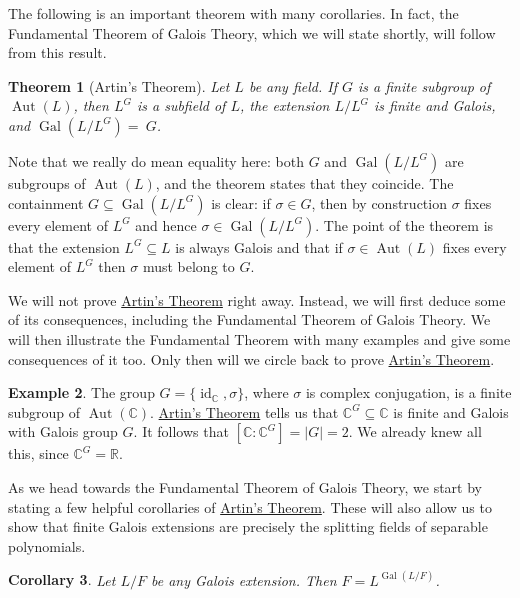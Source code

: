 \documentclass[12pt]{report}
\newtheorem{theorem}{Theorem}[chapter]
\newtheorem{corollary}[theorem]{Corollary}
\numberwithin{equation}{section}
\numberwithin{theorem}{chapter}
\theoremstyle{definition}
\newtheorem{example}[theorem]{Example}
\newtheorem*{basic properties}{Basic Properties}
\newtheorem*{Important Remark}{Important Remark}
\DeclareMathOperator{\Gal}{Gal}
\newcommand{\R}{\mathbb{R}}
\newcommand{\C}{\mathbb{C}}
\DeclareMathOperator{\id}{id}
\DeclareMathOperator{\Aut}{Aut}
\begin{document}
The following is an important theorem with many corollaries. In fact, the Fundamental Theorem of Galois Theory, which we will state shortly, will follow from this result.


\begin{theorem}[Artin's Theorem] \label{Artin's theorem}
Let $L$ be any field. If $G$ is a finite subgroup of $\Aut(L)$, then $L^G$ is a subfield of $L$, the extension $L/L^G$ is finite and Galois, and $\Gal(L/L^G) =~G$.
\end{theorem}

Note that we really do mean equality here: both $G$ and $\Gal(L/L^G)$ are subgroups of $\Aut(L)$, and the theorem states that they coincide. The containment $G \subseteq \Gal(L/L^G)$ is clear: if $\sigma \in G$, then by construction $\sigma$ fixes every element of $L^G$ and hence $\sigma \in \Gal(L/L^G)$. The point of the theorem is that the extension $L^G \subseteq L$ is always Galois and that if $\sigma \in \Aut(L)$ fixes every element of $L^G$ then $\sigma$ must belong to $G$.

We will not prove \hyperref[Artin's theorem]{Artin's Theorem} right away. Instead, we will first deduce some of its consequences, including the Fundamental Theorem of Galois Theory. We will then illustrate the Fundamental Theorem with many examples and give some consequences of it too. Only then will we circle back to prove \hyperref[Artin's theorem]{Artin's Theorem}.

\begin{example} 
The group $G = \{\id_{\C}, \sigma \}$, where $\sigma$ is complex conjugation, is a finite subgroup of $\Aut(\C)$. \hyperref[Artin's theorem]{Artin's Theorem} tells us that $\C^G \subseteq \C$ is finite and Galois with Galois group $G$. It follows that $[\C : \C^G] = |G| = 2$. We already knew all this, since $\C^G = \R$.
\end{example}

As we head towards the Fundamental Theorem of Galois Theory, we start by stating a few helpful corollaries of \hyperref[Artin's theorem]{Artin's Theorem}. These will also allow us to show that finite Galois extensions are precisely the splitting fields of separable polynomials.



\begin{corollary}\label{galois extension base is exactly the fixed points}
 Let $L/F$ be any Galois extension. Then $F = L^{\Gal(L/F)}$.
\end{corollary}
\end{document}

